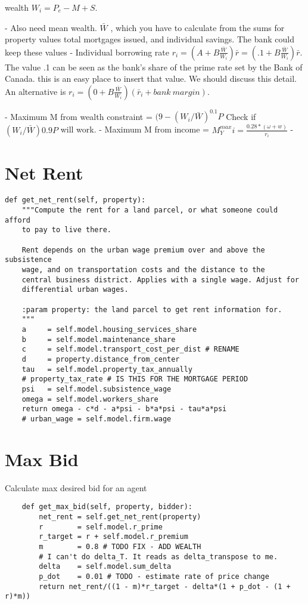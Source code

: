 wealth $W_i = P_e-M+S$.  

- Also need mean wealth. $\bar W$ , which you have to calculate from the sums for property values total mortgages issued, and individual savings. The bank could keep these values
- Individual borrowing rate 
$r_i = (A + B \frac{\bar{W}}{W_i})\bar r=(.1 + B \frac{\bar{W}}{W_i})\bar r$.
The value .1 can be seen as the bank's share of the prime rate set by the Bank of Canada. this is an easy place to insert that value. We should discuss this detail. An alternative is
$r_i = (0 + B \frac{\bar{W}}{W_i})(\bar r_i+ bank\ margin)$.

- Maximum M  from wealth constraint = $(9-(W_i/\bar W)^{0.1}P$
  Check if $(W_i/\bar W)0.9P$ will work. 
- Maximum M  from income = $M^{max}_Yi = \frac{0.28*(\omega+w)}{r_i}$ 
- 

\section{Net Rent}

\begin{lstlisting}
def get_net_rent(self, property):
    """Compute the rent for a land parcel, or what someone could afford
    to pay to live there. 

    Rent depends on the urban wage premium over and above the subsistence
    wage, and on transportation costs and the distance to the
    central business district. Applies with a single wage. Adjust for
    differential urban wages.

    :param property: the land parcel to get rent information for.
    """
    a     = self.model.housing_services_share
    b     = self.model.maintenance_share
    c     = self.model.transport_cost_per_dist # RENAME
    d     = property.distance_from_center 
    tau   = self.model.property_tax_annually 
    # property_tax_rate # IS THIS FOR THE MORTGAGE PERIOD
    psi   = self.model.subsistence_wage
    omega = self.model.workers_share
    return omega - c*d - a*psi - b*a*psi - tau*a*psi
    # urban_wage = self.model.firm.wage
\end{lstlisting}

\section{Max Bid}

Calculate max desired bid for an agent
\begin{lstlisting}
    def get_max_bid(self, property, bidder):
        net_rent = self.get_net_rent(property)
        r        = self.model.r_prime   
        r_target = r + self.model.r_premium
        m        = 0.8 # TODO FIX - ADD WEALTH
        # I can't do delta_T. It reads as delta_transpose to me.
        delta    = self.model.sum_delta 
        p_dot    = 0.01 # TODO - estimate rate of price change
        return net_rent/((1 - m)*r_target - delta*(1 + p_dot - (1 + r)*m))
\end{lstlisting}

